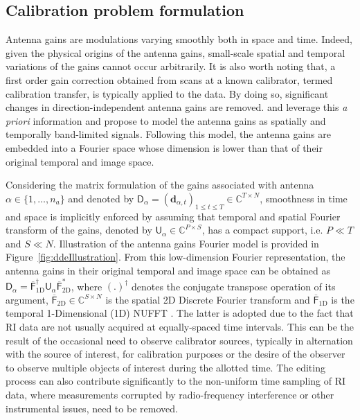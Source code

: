 \documentclass[fleqn,usenatbib]{mnras}
\newcommand{\db}{\ensuremath{\boldsymbol{d}}}
\newcommand{\Db}{\ensuremath{\boldsymbol{\mathsf{D}}}}
\newcommand{\Fb}{\ensuremath{\boldsymbol{\mathsf{F}}}}
\newcommand{\Ub}{\ensuremath{\boldsymbol{\mathsf{U}}}}
\newcommand{\eC}{\mathbb{C}}
\begin{document}
\subsection{Calibration problem formulation}\label{ssec:calpbf}
 Antenna gains are modulations varying smoothly both in space and time. Indeed, given the physical origins of the antenna gains, small-scale spatial and temporal variations of the gains cannot occur
arbitrarily. It is also worth noting that, a first order gain correction obtained from scans at a known calibrator, termed calibration transfer, is typically applied to the data. By doing so, significant changes in
direction-independent antenna gains are removed. \citet{Repetti2017} and \citet{Thouvenin2018} leverage this \emph{a priori} information and propose to model the antenna gains as spatially and temporally band-limited signals. Following this model, the antenna gains are embedded into a Fourier space whose dimension is lower than that of their original temporal and image space.

Considering the matrix formulation of the gains associated with antenna $\alpha \in \{1,\dots,n_a\}$ and denoted by $\Db_{\alpha} =\left(\db_{\alpha,t}\right)_{{1\le t \le T}}\in{\eC^{T\times N}}$, smoothness in time and space is implicitly enforced by assuming that temporal and spatial Fourier transform of the gains, denoted by $\Ub_{\alpha} \in \eC^{P \times S}$, has a compact support, i.e. $P\ll T$ and $S \ll N$. Illustration of the antenna gains Fourier model is provided in Figure~\ref{fig:ddeIllustration}. From this low-dimension Fourier representation, the antenna gains in their original temporal and image space can be obtained as
$\Db_{\alpha} = \overline{\Fb}_{\textrm{1D}}^\dagger \Ub_{\alpha} \overline{\Fb}_{\textrm{2D}}^\ast$,
where $(.)^\dagger$ denotes the conjugate transpose operation of its argument, $\overline{\Fb}_{\textrm{2D}}\in \eC^{S\times N}$ is the spatial 2D Discrete Fourier transform and $\overline{\Fb}_{\textrm{1D}}$ is the temporal 1-Dimensional (1D) NUFFT \citep{Fessler2003}. The latter is adopted due to the fact that RI data are not usually acquired at equally-spaced time intervals. This can be the result of the occasional need to observe calibrator sources, typically in alternation with the source of interest, for calibration purposes or the desire of the observer to observe multiple objects of interest during the allotted time. The editing process can also contribute significantly to the non-uniform time sampling of RI data, where measurements corrupted by radio-frequency interference or other {{instrumental}} issues, need to be removed.

\end{document}
